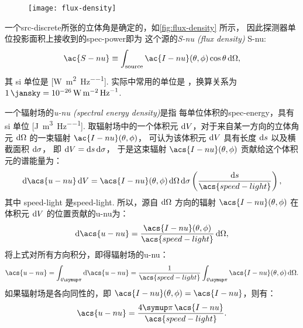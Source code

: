 \begin{figure}[htp]
  \centering
  \texttt{[image: flux-density]}
  \label{fig:flux-density}
\end{figure}

一个\ac{src-discrete}所张的立体角是确定的，如\autoref{fig:flux-density} 所示，
因此探测器单位投影面积上接收到的\ac{spec-power}即为
这个源的\emph{\acl{S-nu} (flux density)} \ac{S-nu}:
\begin{equation}
  \label{eq:flux-density}
  \ac{S-nu} \equiv
    \int_{\R{source}} \ac{I-nu}(\theta,\phi) \cos\theta \,\D{\Omega} ,
\end{equation}
其 \ac{si} 单位是 [\si{\watt\per\square\meter\per\hertz}].
实际中常用的单位是 \si{\jansky}，换算关系为
$\SI{1}{\jansky} = \SI{e-26}{\watt\per\square\meter\per\hertz}$.

一个辐射场的\emph{\acl{u-nu} (spectral energy density)}是指
每单位体积的\ac{spec-energy}，具有 \ac{si} 单位
[\si{\joule\per\cubic\meter\per\hertz}].
取辐射场中的一个体积元 $\mathrm{d}V$，对于来自某一方向的立体角元 $\mathrm{d}\Omega$
的一束辐射 $\ac{I-nu}(\theta,\phi)$，
可认为该体积元 $\mathrm{d}V$ 具有长度 $\mathrm{d}s$ 以及横截面积 $\mathrm{d}\sigma$，
即 $\mathrm{d}V = \mathrm{d}s\,\mathrm{d}\sigma$，
于是这束辐射 $\acs{I-nu}(\theta,\phi)$ 贡献给这个体积元的谱能量为：
\begin{equation}
  \D{\acs{u-nu}}\,\D{V}
    = \acs{I-nu}(\theta,\phi) \,\D{\Omega}\,\D{\sigma}
      \left( \frac{\D{s}}{\acs{speed-light}} \right) ,
\end{equation}
其中 \acs{speed-light} 是\acl{speed-light}.
所以，源自 $\mathrm{d}\Omega$ 方向的辐射 $\acs{I-nu}(\theta,\phi)$
在体积元 $\mathrm{d}V$ 的位置贡献的\acl{u-nu}为：
\begin{equation}
  \D{\acs{u-nu}}
    = \frac{\acs{I-nu}(\theta,\phi)}{\acs{speed-light}} \,\D{\Omega} ,
\end{equation}
将上式对所有方向积分，即得辐射场的\acl{u-nu}：
\begin{equation}
  \label{eq:spectral-energy-density}
  \acs{u-nu}
    = \int_{4\Cpi} \D{\acs{u-nu}}
    = \frac{1}{\acs{speed-light}}
      \int_{4\Cpi} \acs{I-nu}(\theta,\phi) \,\D{\Omega} .
\end{equation}
如果辐射场是各向同性的，即 $\acs{I-nu}(\theta,\phi) = \acs{I-nu}$，则有：
\begin{equation}
  \label{eq:spectral-energy-density-iso}
  \acs{u-nu} = \frac{4\Cpi \, \acs{I-nu}}{\acs{speed-light}} .
\end{equation}

